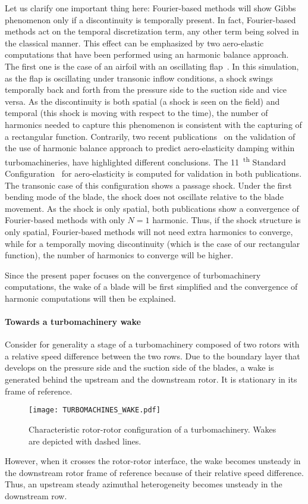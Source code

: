 Let us clarify one important thing here: Fourier-based methods
will show Gibbs phenomenon only if a discontinuity is temporally
present. In fact, Fourier-based methods act on the temporal discretization
term, any other term being solved in the classical manner. 
This effect can be emphasized by two 
aero-elastic computations that have been performed 
using an harmonic
balance approach. The first one is the case of 
an airfoil with an oscillating 
flap~\cite{JDufour2010}. In this simulation, as the flap is oscillating
under transonic inflow conditions, a shock swings temporally
back and forth from the pressure side to the
suction side and vice versa. As the discontinuity is
both spatial (a shock is seen on the field) and temporal
(this shock is moving with respect to the time), the number
of harmonics needed to capture this phenomenon is
consistent with the capturing of a rectangular function.
Contrarily, two recent publications~\cite{Huang2013,JSicot2012} on the validation
of the use of harmonic balance approach to predict
aero-elasticity damping within turbomachineries, have highlighted
different conclusions. The 11~\textsuperscript{th}
Standard Configuration~\cite{Fransson1999} for aero-elasticity is computed
for validation in both publications. The transonic case
of this configuration shows a passage shock. Under the first bending mode
of the blade, the shock does not oscillate relative to the blade
movement. As the shock
is only spatial, both publications show a convergence of 
Fourier-based methods with only $N=1$ harmonic. Thus, if the shock
structure is only spatial, Fourier-based methods will not need
extra harmonics to converge, while for a temporally moving discontinuity
(which is the case of our rectangular function), the number
of harmonics to converge will be higher.

Since the present paper focuses on the convergence of turbomachinery
computations, the wake of a blade will be first
simplified and the convergence of harmonic computations will then be
explained.

\paragraph{Towards a turbomachinery wake}
\label{sec:turbomachine_wake}

Consider for generality a stage of a turbomachinery composed of two rotors
with a relative speed difference between the two rows.
Due to the boundary layer that develops on 
the pressure side and the suction side of the blades, a wake is generated behind
the upstream and the downstream rotor. It is stationary in its frame of reference.
\begin{figure}[htb]
    \centering\texttt{[image: TURBOMACHINES\_WAKE.pdf]}
  \caption{Characteristic rotor-rotor configuration of a turbomachinery. 
  Wakes are depicted with dashed lines.}
  \label{fig:rotor-stator}
\end{figure}
However, when it crosses the rotor-rotor interface,
the wake becomes unsteady in the downstream rotor frame of reference
because of their relative speed difference. Thus, 
an upstream steady azimuthal heterogeneity becomes unsteady in
the downstream row.

